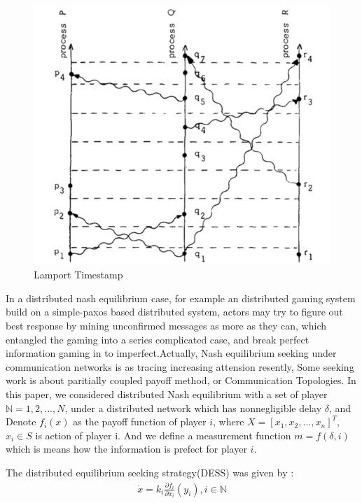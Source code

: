 \documentclass[twocolumn]{article}
\begin{document}
\begin{figure}[H]
  \centering
  \includegraphics[width=1\linewidth]{img/lamportts.png}
  \caption{Lamport Timestamp}
\end{figure}


In a distributed nash equilibrium case, for example an distributed gaming system build on a simple-paxos based distributed system, actors may try to figure out best response by mining unconfirmed messages as more as they can, which entangled the gaming into a series complicated case, and break perfect information gaming in to imperfect.Actually, Nash equilibrium seeking under communication networks is as tracing increasing attension resently, Some seeking work is about paritially coupled payoff method\cite{8029164}, or Communication Topologies\cite{8093754}. In this paper, we considered distributed Nash equilibrium with a set of player $\mathbb{N} = {1, 2, ..., N}$, under a distributed network which has nonnegligible delay $\mathbb{\delta}$, and Denote $f_i(x)$ as the payoff function of player $i$, where $X = [x_1, x_2, ..., x_n]^T$, $x_i \in S$ is action of player i. And we define a measurement function $m = f(\delta, i)$ which is means how the information is prefect for player $i$.

The distributed equilibrium seeking strategy(DESS) was given by \cite{7888532}:
\begin{gather}
  \dot{x} = k_i \frac {\partial f_i}{\partial x_i}(y_i), i \in \mathbb{N}
\end{gather}
\end{document}
